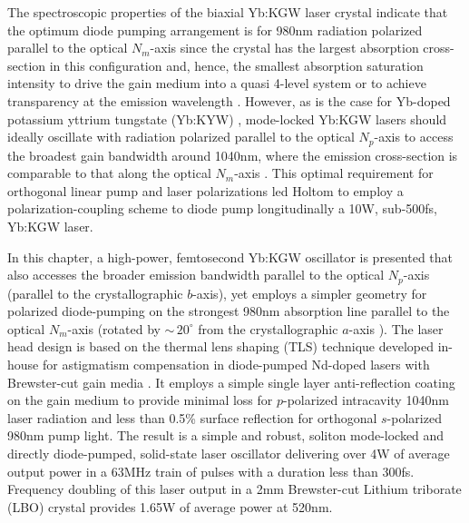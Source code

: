 The spectroscopic properties of the biaxial Yb:KGW laser crystal \cite{Biswal_thermo_optical_05} indicate that the optimum diode pumping arrangement is for 980nm radiation polarized parallel to the optical $N_m$-axis since the crystal has the largest absorption cross-section in this configuration and, hence, the smallest absorption saturation intensity to drive the gain medium into a quasi 4-level system or to achieve transparency at the emission wavelength \cite{Brenier_new_criteria}.
However, as is the case for Yb-doped potassium yttrium tungstate (Yb:KYW) \cite{Liu_diode_pumped_2001,Killi_high_peak_2005}, mode-locked Yb:KGW lasers should ideally oscillate with radiation polarized parallel to the optical $N_p$-axis to access the broadest gain bandwidth around 1040nm, where the emission cross-section is comparable to that along the optical $N_m$-axis \cite{Holtom_mode_locked_2006,Biswal_thermo_optical_05}. This optimal requirement for orthogonal linear pump and laser polarizations led Holtom \cite{Holtom_mode_locked_2006} to employ a polarization-coupling scheme to diode pump longitudinally a 10W, sub-500fs, Yb:KGW laser.

In this chapter, a high-power, femtosecond Yb:KGW oscillator is presented that also accesses the broader emission bandwidth parallel to the optical $N_p$-axis (parallel to the crystallographic $b$-axis), yet employs a simpler geometry for polarized diode-pumping on the strongest 980nm absorption line parallel to the optical $N_m$-axis (rotated by $\sim\,20^\circ$ from the crystallographic $a$-axis \cite{Biswal_thermo_optical_05,mochalov_laser_1997,pujol_crystalline_1999}).
The laser head design is based on the thermal lens shaping (TLS) technique developed in-house for astigmatism compensation in diode-pumped Nd-doped lasers with Brewster-cut gain media \cite{Rimington_thermal_lens_2004}.
It employs a simple single layer  anti-reflection coating on the gain medium to provide minimal loss for $p$-polarized intracavity 1040nm laser radiation and less than 0.5\% surface reflection for orthogonal $s$-polarized 980nm pump light.
The result is a simple and robust, soliton mode-locked and directly diode-pumped, solid-state laser oscillator delivering over 4W of average output power in a 63MHz train of pulses with a duration less than 300fs.
Frequency doubling of this laser output in a 2mm Brewster-cut Lithium triborate (LBO) crystal provides 1.65W of average power at 520nm.

